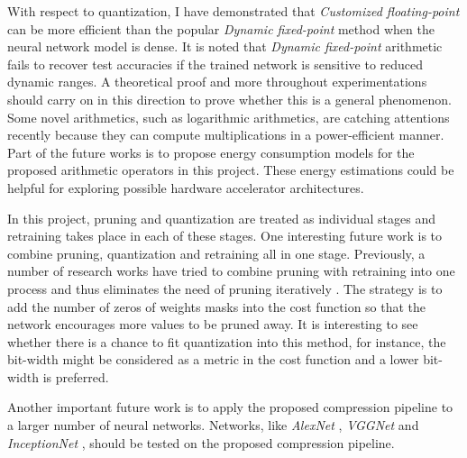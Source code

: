 \documentclass[a4paper,12pt]{report}
\begin{document}
With respect to quantization, I have demonstrated that \textit{Customized floating-point}
can be more efficient than the popular \textit{Dynamic fixed-point} method when
the neural network model is dense.
It is noted that \textit{Dynamic fixed-point} arithmetic fails to recover
test accuracies if the trained network is sensitive to reduced dynamic ranges.
A theoretical proof and more throughout experimentations should carry on
in this direction to prove whether this is a general phenomenon.
Some novel arithmetics, such as logarithmic arithmetics, are catching attentions
recently \cite{tann2017hardware} because they can compute multiplications
in a power-efficient manner.
Part of the future works is to propose energy consumption models for the
proposed arithmetic operators in this project.
These energy estimations could be helpful for exploring possible hardware
accelerator architectures.

In this project, pruning and quantization are treated as individual stages and
retraining takes place in each of these stages.
One interesting future work is to combine pruning, quantization and
retraining all in one stage.
Previously, a number of research works have tried to combine pruning with
retraining into one process and thus eliminates the need of pruning iteratively
\cite{Hassibi, DBLP:journals/corr/MolchanovTKAK16}.
The strategy is to add the number of zeros of weights masks into the cost function so that the
network encourages more values to be pruned away.
It is interesting to see whether there is a chance to fit quantization into this
method, for instance, the bit-width might be considered as a metric in the cost
function and a lower bit-width is preferred.

Another important future work is to apply the proposed compression pipeline to
a larger number of neural networks.
Networks, like \textit{AlexNet} \cite{Krizhevsky}, \textit{VGGNet} \cite{DBLP:journals/corr/SimonyanZ14a}
and \textit{InceptionNet} \cite{szegedy2015going}, should be tested on the
proposed compression pipeline.
\appendix
\singlespacing



\end{document}
